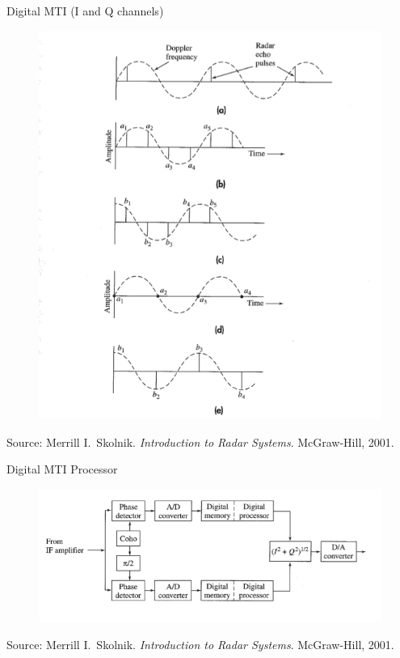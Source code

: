 \documentclass[mathserif]{beamer}
\begin{document}
    \begin{frame}{Digital MTI (I and Q channels)}
      \begin{minipage}[t][0.8\textheight][t]{\textwidth}
 	\begin{figure}[h]
		\centering
		\includegraphics[height=0.7\textheight]{inq}
	\end{figure}
	\vfill
	\tiny{Source: Merrill I.~Skolnik. \emph{Introduction to Radar Systems}. McGraw-Hill, 2001.}
      \end{minipage}
    \end{frame}
    
    \begin{frame}{Digital MTI Processor}
      \begin{minipage}[t][0.8\textheight][t]{\textwidth}
	\begin{figure}[h]
		\centering
		\includegraphics[width=0.9\linewidth]{digitalMTIProcessor}
	\end{figure}
	\vfill
	\tiny{Source: Merrill I.~Skolnik. \emph{Introduction to Radar Systems}. McGraw-Hill, 2001.}
      \end{minipage}
    \end{frame}
    
\end{document}
